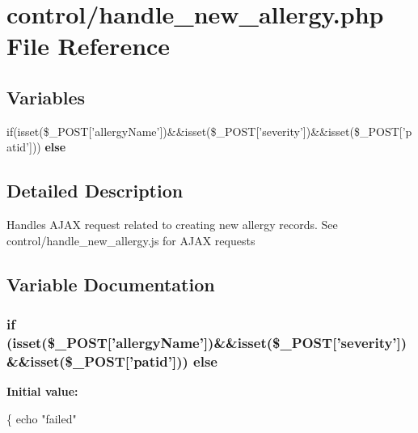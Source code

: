 \hypertarget{handle__new__allergy_8php}{\section{control/handle\-\_\-new\-\_\-allergy.php File Reference}
\label{handle__new__allergy_8php}
}
\subsection*{Variables}
\begin{DoxyCompactItemize}
\item 
if(isset(\$\-\_\-\-P\-O\-S\-T\mbox{[}'allergy\-Name'\mbox{]})\&\&isset(\$\-\_\-\-P\-O\-S\-T\mbox{[}'severity'\mbox{]})\&\&isset(\$\-\_\-\-P\-O\-S\-T\mbox{[}'patid'\mbox{]})) {\bfseries else}
\end{DoxyCompactItemize}


\subsection{Detailed Description}
Handles A\-J\-A\-X request related to creating new allergy records. See control/handle\-\_\-new\-\_\-allergy.\-js for A\-J\-A\-X requests 

\subsection{Variable Documentation}
\hypertarget{handle__new__allergy_8php_a53ff9376e169336e69c1f774c451060b}{
\subsubsection[{else}]{\setlength{\rightskip}{0pt plus 5cm}if (isset(\$\-\_\-\-P\-O\-S\-T\mbox{[}'allergy\-Name'\mbox{]})\&\&isset(\$\-\_\-\-P\-O\-S\-T\mbox{[}'severity'\mbox{]})\&\&isset(\$\-\_\-\-P\-O\-S\-T\mbox{[}'patid'\mbox{]})) else}}\label{handle__new__allergy_8php_a53ff9376e169336e69c1f774c451060b}
{\bfseries Initial value\-:}
\begin{DoxyCode}
\{
    echo \textcolor{stringliteral}{"failed"}
\end{DoxyCode}
